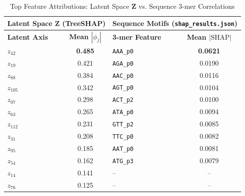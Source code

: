 \documentclass[conference]{IEEEtran}
\begin{document}
\begin{table}[t]
  \centering
  \caption{Top Feature Attributions: Latent Space $\mathbf{Z}$ vs. Sequence 3-mer Correlations}
  \label{tab:shap_attributions}
  \begin{tabular}{lc||lc}
    \toprule
    \multicolumn{2}{c||}{\textbf{Latent Space $\mathbf{Z}$ (TreeSHAP)}} & \multicolumn{2}{c}{\textbf{Sequence Motifs (\texttt{shap\_results.json})}} \\
    \midrule
    \textbf{Latent Axis} & \textbf{Mean $|\phi_j|$} & \textbf{3-mer Feature} & \textbf{Mean $|\text{SHAP}|$} \\
    \midrule
    $z_{42}$             & \textbf{0.485}           & \texttt{AAA\_p0}       & \textbf{0.0621}              \\
    $z_{19}$             & 0.421                    & \texttt{AGA\_p0}       & 0.0190                       \\
    $z_{88}$             & 0.384                    & \texttt{AAC\_p0}       & 0.0116                       \\
    $z_{105}$            & 0.342                    & \texttt{AGT\_p0}       & 0.0104                       \\
    $z_{07}$             & 0.298                    & \texttt{ACT\_p2}       & 0.0100                       \\
    $z_{63}$             & 0.265                    & \texttt{ATA\_p0}       & 0.0094                       \\
    $z_{112}$            & 0.231                    & \texttt{GTT\_p2}       & 0.0085                       \\
    $z_{31}$             & 0.208                    & \texttt{TTC\_p0}       & 0.0082                       \\
    $z_{95}$             & 0.185                    & \texttt{AAT\_p0}       & 0.0081                       \\
    $z_{54}$             & 0.162                    & \texttt{ATG\_p3}       & 0.0079                       \\
    $z_{14}$             & 0.141                    & --                     & --                           \\
    $z_{76}$             & 0.125                    & --                     & --                           \\
    \bottomrule
  \end{tabular}
\end{table}
\end{document}
